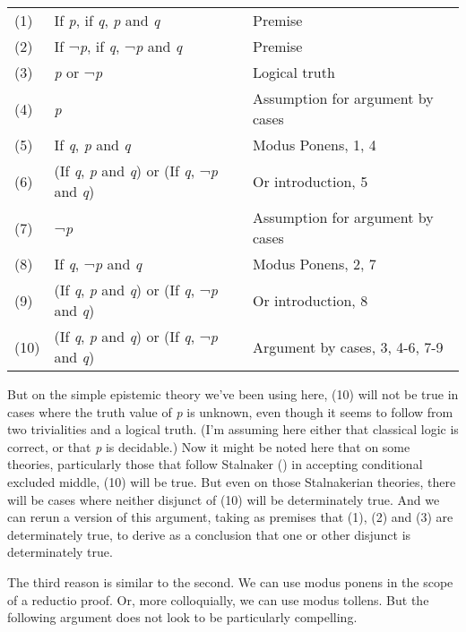 \documentclass[
  11pt,
  letterpaper,
  DIV=11,
  numbers=noendperiod,
  twoside]{scrartcl}
\begin{document}
\begin{longtable}[]{@{}
  >{\raggedleft\arraybackslash}p{}
  >{\raggedright\arraybackslash}p{}
  >{\raggedright\arraybackslash}p{}@{}}
\toprule\noalign{}
\endhead
\bottomrule\noalign{}
\endlastfoot
(1) & If \emph{p}, if \emph{q}, \emph{p} and \emph{q} & Premise \\
(2) & If ¬\emph{p}, if \emph{q}, ¬\emph{p} and \emph{q} & Premise \\
(3) & \emph{p} or ¬\emph{p} & Logical truth \\
(4) & \emph{p} & Assumption for argument by cases \\
(5) & If \emph{q}, \emph{p} and \emph{q} & Modus Ponens, 1, 4 \\
(6) & (If \emph{q}, \emph{p} and \emph{q}) or (If \emph{q}, ¬\emph{p}
and \emph{q}) & Or introduction, 5 \\
(7) & ¬\emph{p} & Assumption for argument by cases \\
(8) & If \emph{q}, ¬\emph{p} and \emph{q} & Modus Ponens, 2, 7 \\
(9) & (If \emph{q}, \emph{p} and \emph{q}) or (If \emph{q}, ¬\emph{p}
and \emph{q}) & Or introduction, 8 \\
(10) & (If \emph{q}, \emph{p} and \emph{q}) or (If \emph{q}, ¬\emph{p}
and \emph{q}) & Argument by cases, 3, 4-6, 7-9 \\
\end{longtable}

But on the simple epistemic theory we've been using here, (10) will not
be true in cases where the truth value of \emph{p} is unknown, even
though it seems to follow from two trivialities and a logical truth.
(I'm assuming here either that classical logic is correct, or that
\emph{p} is decidable.) Now it might be noted here that on some
theories, particularly those that follow Stalnaker
() in accepting conditional excluded
middle, (10) will be true. But even on those Stalnakerian theories,
there will be cases where neither disjunct of (10) will be determinately
true. And we can rerun a version of this argument, taking as premises
that (1), (2) and (3) are determinately true, to derive as a conclusion
that one or other disjunct is determinately true.

The third reason is similar to the second. We can use modus ponens in
the scope of a reductio proof. Or, more colloquially, we can use modus
tollens. But the following argument does not look to be particularly
compelling.
\end{document}
